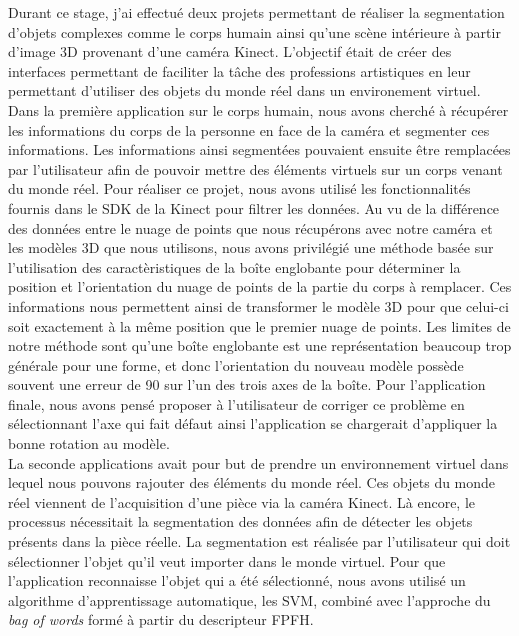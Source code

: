 Durant ce stage, j'ai effectué deux projets permettant de réaliser la segmentation d'objets complexes comme le corps
humain ainsi qu'une scène intérieure à partir d'image 3D provenant d'une caméra Kinect. L'objectif était de créer
des interfaces permettant de faciliter la tâche des professions artistiques en leur permettant d'utiliser 
des objets du monde réel dans un environement virtuel. Dans la première application sur le corps humain,
nous avons cherché à récupérer les informations du corps de la personne en face de la caméra et segmenter
ces informations. Les informations ainsi segmentées pouvaient ensuite être remplacées par l'utilisateur afin de 
pouvoir mettre des éléments virtuels sur un corps venant du monde réel. Pour réaliser ce projet, nous avons 
utilisé les fonctionnalités fournis dans le SDK de la Kinect pour filtrer les données. Au vu de la différence
des données entre le nuage de points que nous récupérons avec notre caméra et les modèles 3D que nous utilisons,
nous avons privilégié une méthode basée sur l'utilisation des caractèristiques de la boîte englobante pour
déterminer la position et l'orientation du nuage de points de la partie du corps à remplacer. Ces informations
nous permettent ainsi de transformer le modèle 3D pour que celui-ci soit exactement à la même position que
le premier nuage de points. Les limites de notre méthode sont qu'une boîte englobante est une représentation 
beaucoup trop générale pour une forme, et donc l'orientation du nouveau modèle possède souvent une erreur de 90\degre
sur l'un des trois axes de la boîte. Pour l'application finale, nous avons pensé proposer à l'utilisateur de 
corriger ce problème en sélectionnant l'axe qui fait défaut ainsi l'application se chargerait d'appliquer la
bonne rotation au modèle.\\

La seconde applications avait pour but de prendre un environnement virtuel dans lequel nous pouvons rajouter des éléments 
du monde réel. Ces objets du monde réel viennent de l'acquisition d'une pièce via la caméra Kinect. Là encore, le processus nécessitait 
la segmentation des données afin de détecter les objets présents dans la pièce réelle. La segmentation est réalisée 
par l'utilisateur qui doit sélectionner l'objet qu'il veut importer dans le monde virtuel. Pour que l'application
reconnaisse l'objet qui a été sélectionné, nous avons utilisé un algorithme d'apprentissage automatique, les SVM,
combiné avec l'approche du \textit{bag of words} formé à partir du descripteur FPFH.\\

